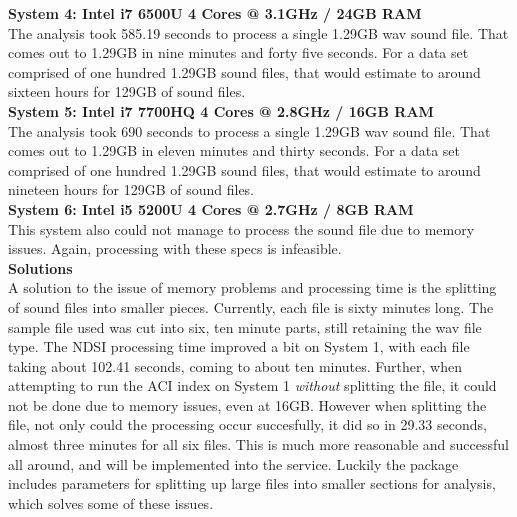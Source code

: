 \noindent\textbf{System 4: Intel i7 6500U 4 Cores @ 3.1GHz / 24GB RAM}\\
The analysis took 585.19 seconds to process a single 1.29GB wav sound file. That comes out to 1.29GB in nine minutes and forty five seconds. For a data set comprised of one hundred 1.29GB sound files, that would estimate to around sixteen hours for 129GB of sound files.\\

\noindent\textbf{System 5: Intel i7 7700HQ 4 Cores @ 2.8GHz / 16GB RAM}\\
The analysis took 690 seconds to process a single 1.29GB wav sound file. That comes out to 1.29GB in eleven minutes and thirty seconds. For a data set comprised of one hundred 1.29GB sound files, that would estimate to around nineteen hours for 129GB of sound files.\\

\noindent\textbf{System 6: Intel i5 5200U 4 Cores @ 2.7GHz / 8GB RAM}\\
This system also could not manage to process the sound file due to memory issues. Again, processing with these specs is infeasible.\\

\noindent\textbf{Solutions}\\
A solution to the issue of memory problems and processing time is the splitting of sound files into smaller pieces. Currently, each file is sixty minutes long. The sample file used was cut into six, ten minute parts, still retaining the wav file type. The NDSI processing time improved a bit on System 1, with each file taking  about 102.41 seconds, coming to about ten minutes. Further, when attempting to run the ACI index on System 1 \textit{without} splitting the file, it could not be done due to memory issues, even at 16GB. However when splitting the file, not only could the processing occur succesfully, it did so in 29.33 seconds, almost three minutes for all six files. This is much more reasonable and successful all around, and will be implemented into the service. Luckily the  package includes parameters for splitting up large files into smaller sections for analysis, which solves some of these issues.\\

